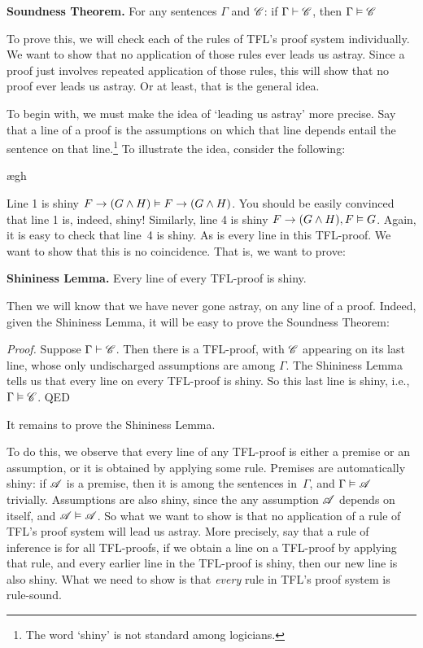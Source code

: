\begin{factoidboxe}\textbf{Soundness Theorem.} For any sentences $\Gamma$ and $\mathscr{C}$: if $\Gamma\vdash\mathscr{C}$, then $\Gamma \vDash\mathscr{C}$
\end{factoidboxe}

To prove this, we will check each of the rules of TFL's proof system individually. We want to show that no application of those rules ever leads us astray. Since a proof just involves repeated application of those rules, this will show that no proof ever leads us astray. Or at least, that is the general idea.

To begin with, we must make the idea of `leading us astray' more precise. Say that a line of a proof is  \ifeff{} the assumptions on which that line depends entail the sentence on that line.\footnote{The word `shiny' is not standard among logicians.} To illustrate the idea, consider the following:
	\begin{fitchproof}
		\PR
		\open
			\AS
			\ae{gh}
		\close
	\end{fitchproof}\noindent\noindent
Line 1 is shiny \ifeff{} $F \rightarrow (G \wedge H) \vDash F \rightarrow (G \wedge H)$. You should be easily convinced that line 1 is, indeed, shiny! Similarly, line 4 is shiny \ifeff{} $F \rightarrow (G \wedge H), F \vDash G$. Again, it is easy to check that line~4 is shiny. As is every line in this TFL-proof. We want to show that this is no coincidence. That is, we want to prove:
	\begin{factoidboxe}\textbf{Shininess Lemma.}
		Every line of every TFL-proof is shiny.
	\end{factoidboxe}\noindent
Then we will know that we have never gone astray, on any line of a proof. Indeed, given the Shininess Lemma, it will be easy to prove the Soundness Theorem:

\emph{Proof.} Suppose $\Gamma \vdash \mathscr{C}$. Then there is a TFL-proof, with $\mathscr{C}$ appearing on its last line, whose only undischarged assumptions are among $\Gamma$. The Shininess Lemma tells us that every line on every TFL-proof is shiny. So this last line is shiny, i.e., $\Gamma \vDash \mathscr{C}$. QED

It remains to prove the Shininess Lemma.

To do this, we observe that every line of any TFL-proof is either a
premise or an assumption, or it is obtained by applying some rule.
Premises are automatically shiny: if $\mathscr{A}$ is a premise, then it
is among the sentences in~$\Gamma$, and $\Gamma \vDash \mathscr{A}$
trivially. Assumptions are also shiny, since the any assumption
$\mathscr{A}$ depends on itself, and $\mathscr{A} \vDash \mathscr{A}$. So
what we want to show is that no application of a rule of TFL's proof
system will lead us astray. More precisely, say that a rule of
inference is  \emph{\ifeff} for all TFL-proofs, if
we obtain a line on a TFL-proof by applying that rule, and every
earlier line in the TFL-proof is shiny, then our new line is also
shiny. What we need to show is that \emph{every} rule in TFL's proof
system is rule-sound.

